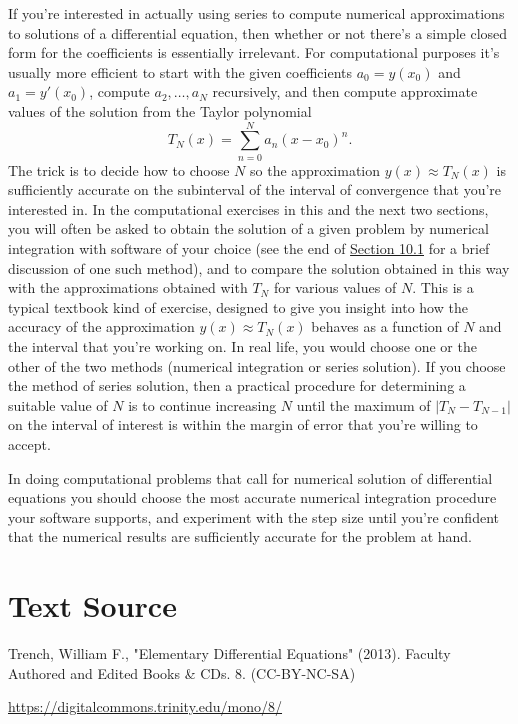 \documentclass{ximera}
\begin{document}
If you're interested in actually using series to compute numerical
approximations to solutions of a differential equation, then whether
or not there's a simple closed form for the coefficients is
essentially irrelevant. For computational purposes it's usually
more efficient to start with the given coefficients $a_0=y(x_0)$ and
$a_1=y'(x_0)$, compute $a_2, \dots, a_N$ recursively,
 and then compute approximate values of the solution from the
Taylor polynomial
$$
T_N(x)=\sum_{n=0}^Na_n(x-x_0)^n.
$$
The trick is to decide how to choose $N$ so the approximation
$y(x)\approx T_N(x)$ is sufficiently accurate on the subinterval of
the interval of convergence that you're interested in. In the
computational exercises in this  and the next two sections,
you will often be asked to obtain the solution of a given problem by
numerical integration with  software  of your choice (see
the end of \href{https://xerxes.ximera.org/differentialequations/main/introToSystems/introToSystems}{Section 10.1} 
for a brief discussion of one such method),
and to compare the solution obtained in this way with the
approximations obtained with $T_N$ for various values of $N$. This is
a typical textbook kind of exercise, designed to give you insight into
how the accuracy of the approximation $y(x)\approx T_N(x)$ behaves as
a function of $N$ and the interval that you're working on. In real
life, you would choose one or the other of the two methods (numerical
integration or series solution). If you choose the method of series
solution, then a practical procedure for determining a suitable value
of $N$ is to continue increasing $N$ until the maximum of
$|T_N-T_{N-1}|$ on the interval of interest is within the margin of
error that you're willing to accept.

In doing computational problems  that call for
numerical solution of differential equations you should
choose the most accurate numerical integration procedure your
software supports, and experiment with the step size until
you're confident that the numerical results are sufficiently
accurate for the problem at hand.




\section*{Text Source}
Trench, William F., "Elementary Differential Equations" (2013). Faculty Authored and Edited Books \& CDs. 8. (CC-BY-NC-SA)

\href{https://digitalcommons.trinity.edu/mono/8/}{https://digitalcommons.trinity.edu/mono/8/}
\end{document}
